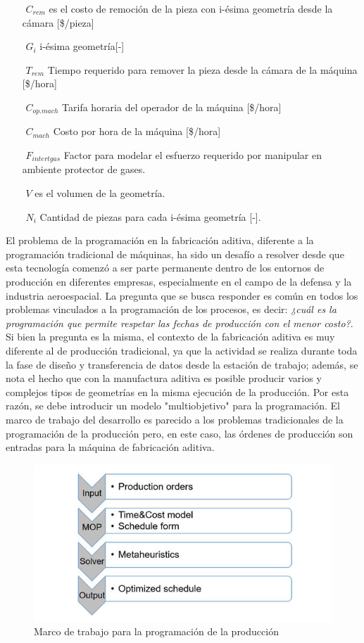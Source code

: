 \begin{description}
\begin{itemize}
\item[$ $] $C_{rem} $ es el costo de remoción de la pieza con i-ésima geometría desde la cámara [\$/pieza]
\item[$ $] $G_i $ i-ésima geometría[-]
\item[$ $] $T_{rem} $ Tiempo requerido para remover la pieza desde la cámara de la máquina [\$/hora]
\item[$ $] $C_{op.mach} $ Tarifa horaria del operador de la máquina [\$/hora]
\item[$ $] $C_{mach} $ Costo por hora de la máquina [\$/hora]
\item[$ $] $F_{intertgas} $ Factor para modelar el esfuerzo requerido por manipular en ambiente protector de gases.
\item[$ $] $V $ es el volumen de la geometría.
\item[$ $] $N_i$ Cantidad de piezas para cada i-ésima geometría [-].
\end{itemize}

El problema de la programación en la fabricación aditiva, diferente a la programación tradicional de máquinas, ha sido un desafío a resolver desde que esta tecnología comenzó a ser parte permanente dentro de los entornos de producción en diferentes empresas, especialmente en el campo de la defensa y la industria aeroespacial. La pregunta que se busca responder es común en todos los problemas vinculados a la programación de los procesos, es decir: \textit{¿cuál es la programación que permite respetar las fechas de producción con el menor costo?}.
Si bien la pregunta es la misma, el contexto de la fabricación aditiva es muy diferente al de producción tradicional, ya que la actividad se realiza durante toda la fase de diseño y transferencia de datos desde la estación de trabajo; además, se nota el hecho que con la manufactura aditiva es posible producir varios y complejos tipos de geometrías en la misma ejecución de la producción. Por esta razón, se debe introducir un modelo "multiobjetivo" para la programación.
El marco de trabajo del desarrollo es parecido a los problemas tradicionales de la programación de la producción pero, en este caso, las órdenes de producción son entradas para la máquina de fabricación aditiva.
\begin{figure}[H]
\centering
\includegraphics[scale=0.8]{images/mapaproduccion.png} 
\caption{Marco de trabajo para la programación de la producción \parencite{fera2018}}
\end{figure}


\end{description}
